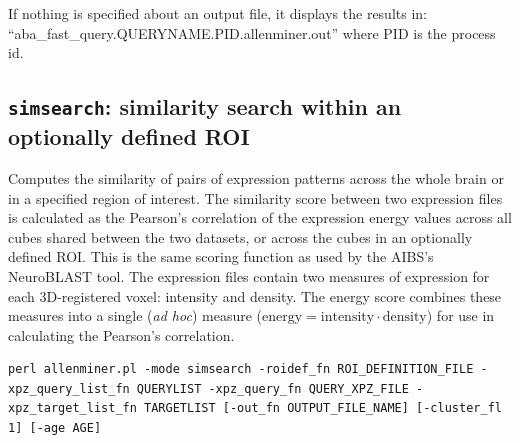 \documentclass[10pt]{article}
\begin{document}
If nothing is specified about an output file, it displays the results in:\\``aba\_fast\_query.QUERYNAME.PID.allenminer.out'' where PID is the process id.\\

\subsection{{\tt simsearch}: similarity search within an optionally defined ROI}

Computes the similarity of pairs of expression patterns across the whole brain or in a specified region of interest. The similarity score between two expression files is calculated as the Pearson's correlation of the expression energy values across all cubes shared between the two datasets, or across the cubes in an optionally defined ROI. This is the same scoring function as used by the AIBS's NeuroBLAST tool. The expression files contain two measures of expression for each 3D-registered voxel: intensity and density. The energy score combines these measures into a single ({\it ad hoc}) measure ($\mbox{energy} = \mbox{intensity} \cdot \mbox{density}$) for use in calculating the Pearson's correlation.\\

\begin{lstlisting}
perl allenminer.pl -mode simsearch -roidef_fn ROI_DEFINITION_FILE -xpz_query_list_fn QUERYLIST -xpz_query_fn QUERY_XPZ_FILE -xpz_target_list_fn TARGETLIST [-out_fn OUTPUT_FILE_NAME] [-cluster_fl 1] [-age AGE]
\end{lstlisting}
\end{document}
